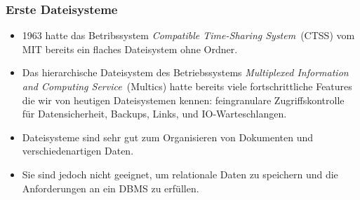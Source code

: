 \documentclass[aspectratio=169,mathserif,notheorems]{beamer}%
\begin{document}
\begin{frame}[t]%
\frametitle{Erste Dateisysteme}%
\begin{itemize}%
\item 1963 hatte das Betribssystem \emph{Compatible Time-Sharing System}~(CTSS)\cite{CMDDCHOK1963TCTSSAPG} vom MIT bereits ein flaches Dateisystem ohne Ordner\cite{OD1963TCCSLABTCDE}.%
\item<2-> Das hierarchische Dateisystem des Betriebssystems \emph{Multiplexed Information and Computing Service}~(Multics)\cite{CV1965IAOOTMS,BWAOEOSH:M} hatte \citeyear{DN1965AGPFSFSS} bereits viele fortschrittliche Features die wir von heutigen Dateisystemen kennen: feingranulare Zugriffskontrolle für Datensicherheit, Backups, Links, und IO-Warteschlangen.%
\item<3-> Dateisysteme sind sehr gut zum Organisieren von Dokumenten und verschiedenartigen Daten.%
\item<4-> Sie sind jedoch nicht geeignet, um relationale Daten zu speichern und die Anforderungen an ein DBMS zu erfüllen.%
\end{itemize}%
%
%
%
\end{frame}%
%
\end{document}
